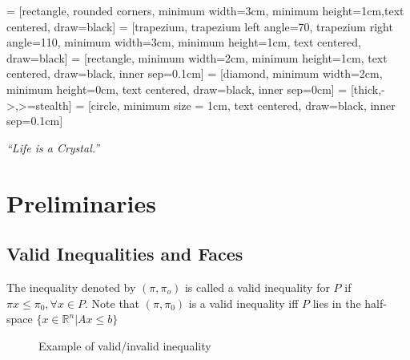 
\usepackage{makecell}
\usepackage{float}
\newcommand{\floor}[1]{\left\lfloor #1 \right\rfloor}
\newcommand{\ceil}[1]{\left\lceil #1 \right\rceil}

\usetikzlibrary{shapes.geometric, arrows}
     = [rectangle, rounded corners, minimum width=3cm, minimum height=1cm,text centered, draw=black]
     = [trapezium, trapezium left angle=70, trapezium right angle=110, minimum width=3cm, minimum height=1cm, text centered, draw=black]
     = [rectangle, minimum width=2cm, minimum height=1cm, text centered, draw=black, inner sep=0.1cm]
     = [diamond, minimum width=2cm, minimum height=0cm, text centered, draw=black, inner sep=0cm]
     = [thick,->,>=stealth]
     = [circle, minimum size = 1cm, text centered, draw=black, inner sep=0.1cm]

\renewcommand{\docTitle}{Lecture 4 - Polyhedral Analysis and Cutting Plane Method}
\renewcommand{\docAuthor}{Lan Peng, Ph.D.}
\renewcommand{\docAffil}{School of Management, Shanghai University, Shanghai, China}

    \titleSec

    \begin{center}
        \textit{``Life is a Crystal.''}
    \end{center}
    \section{Preliminaries}
        \subsection{Valid Inequalities and Faces}
            The inequality denoted by $(\pi, \pi_o)$ is called a valid inequality for $P$ if $\pi x \le \pi_0, \forall x \in P$. Note that $(\pi, \pi_0)$ is a valid inequality iff $P$ lies in the half-space $\{x\in \mathbb{R}^n|Ax\le b\}$

            \begin{figure}[H]
            \centering
            \caption{Example of valid/invalid inequality}
            \end{figure}

